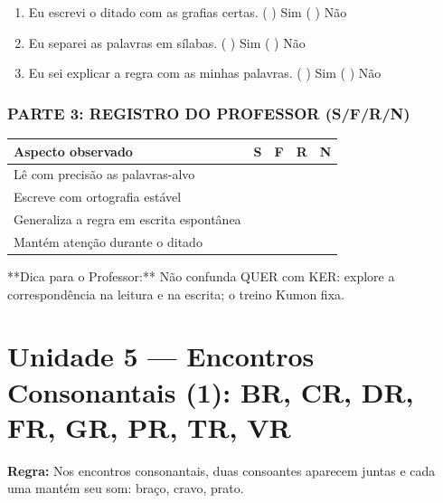 \begin{exercicio}
\begin{enumerate}[label=\alph*)]
  \item Eu escrevi o ditado com as grafias certas.  \quad ( ) Sim   ( ) Não

  \item Eu separei as palavras em sílabas.  \quad ( ) Sim   ( ) Não

  \item Eu sei explicar a regra com as minhas palavras.  \quad ( ) Sim   ( ) Não

\end{enumerate}

\subsection*{PARTE 3: REGISTRO DO PROFESSOR (S/F/R/N)}

\begin{center}
\renewcommand{\arraystretch}{1.4}
\begin{tabular}{@{}p{9cm}cccc@{}}
\toprule
Aspecto observado & S & F & R & N \\
\midrule
Lê com precisão as palavras-alvo & & & & \\
Escreve com ortografia estável & & & & \\
Generaliza a regra em escrita espontânea & & & & \\
Mantém atenção durante o ditado & & & & \\
\bottomrule\end{tabular}\end{center}

\end{exercicio}

\begin{dica}
**Dica para o Professor:** Não confunda QUER com KER: explore a correspondência na leitura e na escrita; o treino Kumon fixa.
\end{dica}


\chapter{Unidade 5 --- Encontros Consonantais (1): BR, CR, DR, FR, GR, PR, TR, VR}


\textbf{Regra:} Nos encontros consonantais, duas consoantes aparecem juntas e cada uma mantém seu som: braço, cravo, prato.

